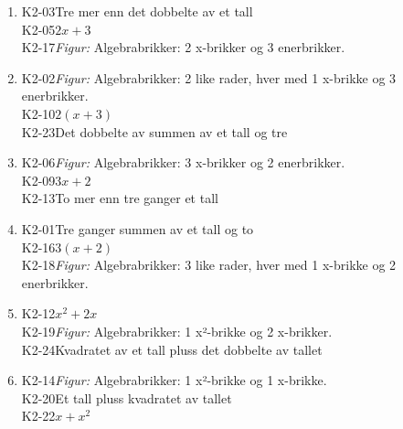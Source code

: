 \documentclass[11pt,a4paper]{article}
\begin{document}
\begin{enumerate}[leftmargin=1.6em, itemsep=0.7em]
\item \begin{minipage}[t]{\linewidth}\textsf{\small K2-03}\quad Tre mer enn det dobbelte av et tall \\ \textsf{\small K2-05}\quad $2x + 3$ \\ \textsf{\small K2-17}\quad \emph{Figur:} Algebrabrikker: 2 x-brikker og 3 enerbrikker.\end{minipage}
\item \begin{minipage}[t]{\linewidth}\textsf{\small K2-02}\quad \emph{Figur:} Algebrabrikker: 2 like rader, hver med 1 x-brikke og 3 enerbrikker. \\ \textsf{\small K2-10}\quad $2(x + 3)$ \\ \textsf{\small K2-23}\quad Det dobbelte av summen av et tall og tre\end{minipage}
\item \begin{minipage}[t]{\linewidth}\textsf{\small K2-06}\quad \emph{Figur:} Algebrabrikker: 3 x-brikker og 2 enerbrikker. \\ \textsf{\small K2-09}\quad $3x + 2$ \\ \textsf{\small K2-13}\quad To mer enn tre ganger et tall\end{minipage}
\item \begin{minipage}[t]{\linewidth}\textsf{\small K2-01}\quad Tre ganger summen av et tall og to \\ \textsf{\small K2-16}\quad $3(x + 2)$ \\ \textsf{\small K2-18}\quad \emph{Figur:} Algebrabrikker: 3 like rader, hver med 1 x-brikke og 2 enerbrikker.\end{minipage}
\item \begin{minipage}[t]{\linewidth}\textsf{\small K2-12}\quad $x^2 + 2x$ \\ \textsf{\small K2-19}\quad \emph{Figur:} Algebrabrikker: 1 x²-brikke og 2 x-brikker. \\ \textsf{\small K2-24}\quad Kvadratet av et tall pluss det dobbelte av tallet\end{minipage}
\item \begin{minipage}[t]{\linewidth}\textsf{\small K2-14}\quad \emph{Figur:} Algebrabrikker: 1 x²-brikke og 1 x-brikke. \\ \textsf{\small K2-20}\quad Et tall pluss kvadratet av tallet \\ \textsf{\small K2-22}\quad $x + x^2$\end{minipage}

\end{enumerate}
\end{document}

